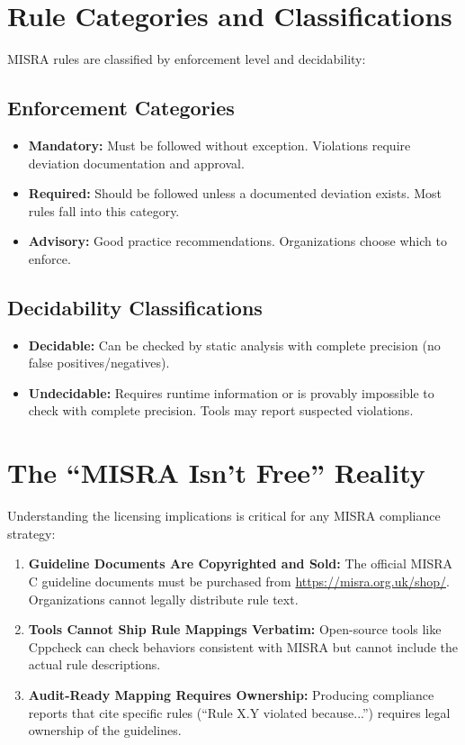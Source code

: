 \documentclass[11pt,letterpaper]{report}
\begin{document}
\section{Rule Categories and Classifications}

MISRA rules are classified by enforcement level and decidability:

\subsection{Enforcement Categories}

\begin{itemize}[leftmargin=*]
    \item \textbf{Mandatory:} Must be followed without exception. Violations require deviation documentation and approval.
    \item \textbf{Required:} Should be followed unless a documented deviation exists. Most rules fall into this category.
    \item \textbf{Advisory:} Good practice recommendations. Organizations choose which to enforce.
\end{itemize}

\subsection{Decidability Classifications}

\begin{itemize}[leftmargin=*]
    \item \textbf{Decidable:} Can be checked by static analysis with complete precision (no false positives/negatives).
    \item \textbf{Undecidable:} Requires runtime information or is provably impossible to check with complete precision. Tools may report suspected violations.
\end{itemize}

\section{The ``MISRA Isn't Free'' Reality}

Understanding the licensing implications is critical for any MISRA compliance strategy:

\begin{enumerate}[leftmargin=*]
    \item \textbf{Guideline Documents Are Copyrighted and Sold:} The official MISRA C guideline documents must be purchased from \url{https://misra.org.uk/shop/}. Organizations cannot legally distribute rule text.

    \item \textbf{Tools Cannot Ship Rule Mappings Verbatim:} Open-source tools like Cppcheck can check behaviors consistent with MISRA but cannot include the actual rule descriptions.

    \item \textbf{Audit-Ready Mapping Requires Ownership:} Producing compliance reports that cite specific rules (``Rule X.Y violated because...'') requires legal ownership of the guidelines.
\end{enumerate}
\end{document}
